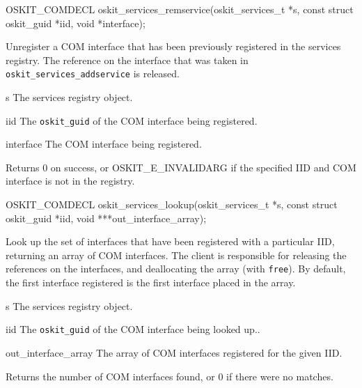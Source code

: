 \begin{apisyn}

	\funcproto OSKIT_COMDECL
	oskit_services_remservice(oskit_services_t *s,
				  const struct oskit_guid *iid,
				  void *interface);
\end{apisyn}
\begin{apidesc}
	Unregister a COM interface that has been previously registered in
	the services registry. The reference on the interface that was
	taken in {\tt oskit_services_addservice} is released.
\end{apidesc}
\begin{apiparm}
	\item[s]
		The services registry object.
	\item[iid]
		The {\tt oskit_guid} of the COM interface being registered.
	\item[interface]
		The COM interface being registered.
\end{apiparm}
\begin{apiret}
	Returns 0 on success, or OSKIT_E_INVALIDARG if the specified IID
	and COM interface is not in the registry.
\end{apiret}


\begin{apisyn}

	\funcproto OSKIT_COMDECL
	oskit_services_lookup(oskit_services_t *s,
			  const struct oskit_guid *iid,
                          \outparam void ***out_interface_array);
\end{apisyn}
\begin{apidesc}
	Look up the set of interfaces that have been registered with a
	particular IID, returning an array of COM interfaces. The client is
	responsible for releasing the references on the interfaces, and
	deallocating the array (with \texttt{free}). By default, the first
	interface registered is the first interface placed in the array.
\end{apidesc}
\begin{apiparm}
	\item[s]
		The services registry object.
	\item[iid]
		The {\tt oskit_guid} of the COM interface being looked up..
	\item[out_interface_array]
		The array of COM interfaces registered for the given IID.
\end{apiparm}
\begin{apiret}
	Returns the number of COM interfaces found, or 0 if there were no
	matches.
\end{apiret}


